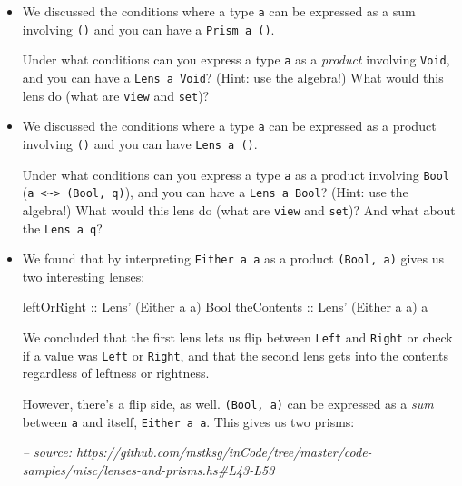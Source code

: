 \documentclass[]{article}
\newenvironment{Shaded}{}{}
\newcommand{\CommentTok}[1]{\textcolor[rgb]{0.38,0.63,0.69}{\textit{#1}}}
\newcommand{\DataTypeTok}[1]{\textcolor[rgb]{0.56,0.13,0.00}{#1}}
\newcommand{\NormalTok}[1]{#1}
\newcommand{\OtherTok}[1]{\textcolor[rgb]{0.00,0.44,0.13}{#1}}
\begin{document}
\begin{itemize}
\item
  We discussed the conditions where a type \texttt{a} can be expressed as a sum
  involving \texttt{()} and you can have a
  \texttt{Prism\textquotesingle{}\ a\ ()}.

  Under what conditions can you express a type \texttt{a} as a \emph{product}
  involving \texttt{Void}, and you can have a
  \texttt{Lens\textquotesingle{}\ a\ Void}? (Hint: use the algebra!) What would
  this lens do (what are \texttt{view} and \texttt{set})?
\item
  We discussed the conditions where a type \texttt{a} can be expressed as a
  product involving \texttt{()} and you can have
  \texttt{Lens\textquotesingle{}\ a\ ()}.

  Under what conditions can you express a type \texttt{a} as a product involving
  \texttt{Bool}
  (\texttt{a\ \textless{}\textasciitilde{}\textgreater{}\ (Bool,\ q)}), and you
  can have a \texttt{Lens\textquotesingle{}\ a\ Bool}? (Hint: use the algebra!)
  What would this lens do (what are \texttt{view} and \texttt{set})? And what
  about the \texttt{Lens\textquotesingle{}\ a\ q}?
\item
  We found that by interpreting \texttt{Either\ a\ a} as a product
  \texttt{(Bool,\ a)} gives us two interesting lenses:

\begin{Shaded}
\begin{Highlighting}[]
\OtherTok{leftOrRight ::} \DataTypeTok{Lens'}\NormalTok{ (}\DataTypeTok{Either}\NormalTok{ a a) }\DataTypeTok{Bool}
\OtherTok{theContents ::} \DataTypeTok{Lens'}\NormalTok{ (}\DataTypeTok{Either}\NormalTok{ a a) a}
\end{Highlighting}
\end{Shaded}

  We concluded that the first lens lets us flip between \texttt{Left} and
  \texttt{Right} or check if a value was \texttt{Left} or \texttt{Right}, and
  that the second lens gets into the contents regardless of leftness or
  rightness.

  However, there's a flip side, as well. \texttt{(Bool,\ a)} can be expressed as
  a \emph{sum} between \texttt{a} and itself, \texttt{Either\ a\ a}. This gives
  us two prisms:

\begin{Shaded}
\begin{Highlighting}[]
\CommentTok{-- source: https://github.com/mstksg/inCode/tree/master/code-samples/misc/lenses-and-prisms.hs#L43-L53}


\end{Highlighting}
\end{Shaded}
\end{itemize}
\end{document}
